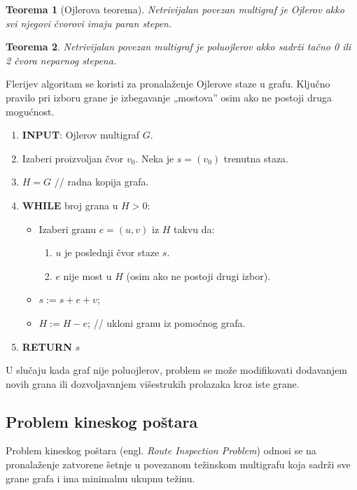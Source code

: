 \documentclass[a4paper,12pt,twoside]{report}
\newtheorem{theorem}{Teorema}[section]
\numberwithin{algorithm}{section}
\begin{document}
\begin{theorem}[Ojlerova teorema]
    Netrivijalan povezan multigraf je Ojlerov akko svi njegovi čvorovi imaju paran stepen.
\end{theorem}

\begin{theorem}
    Netrivijalan povezan multigraf je poluojlerov akko sadrži tačno 0 ili 2 čvora neparnog stepena.
\end{theorem}


Flerijev algoritam se koristi za pronalaženje Ojlerove staze u grafu. Ključno pravilo pri izboru grane je izbegavanje „mostova” osim ako ne postoji druga mogućnost.

\begin{algorithm}[ht]
    \caption{Flerijev algoritam}
    \begin{enumerate}
        \item \textbf{INPUT}: Ojlerov multigraf $G$.
        \item Izaberi proizvoljan čvor $v_0$. Neka je $s = (v_0)$ trenutna staza.
        \item $H = G$ // radna kopija grafa.
        \item \textbf{WHILE} broj grana u $H > 0$:
        \begin{itemize}
            \item Izaberi granu $e = (u, v)$ iz $H$ takvu da:
            \begin{enumerate}
                \item $u$ je poslednji čvor staze $s$.
                \item $e$ nije most u $H$ (osim ako ne postoji drugi izbor).
            \end{enumerate}
            \item $s := s + e + v$; 
            \item $H := H - e$; // ukloni granu iz pomoćnog grafa.
        \end{itemize}
        \item \textbf{RETURN} $s$
    \end{enumerate}
\end{algorithm}



U slučaju kada graf nije poluojlerov, problem se može modifikovati dodavanjem novih grana ili dozvoljavanjem višestrukih prolazaka kroz iste grane.


\subsection{Problem kineskog poštara}
Problem kineskog poštara (engl. \textit{Route Inspection Problem}) odnosi se na pronalaženje zatvorene šetnje u povezanom težinskom multigrafu koja sadrži sve grane grafa i ima minimalnu ukupnu težinu.
\end{document}
